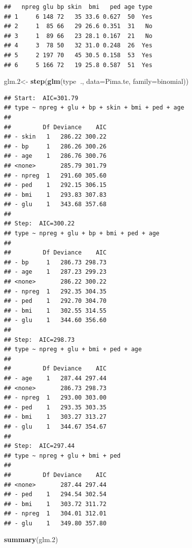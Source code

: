 \documentclass[]{book}
\newenvironment{Shaded}{\begin{snugshade}}{\end{snugshade}}
\newcommand{\KeywordTok}[1]{\textcolor[rgb]{0.13,0.29,0.53}{\textbf{#1}}}
\newcommand{\DataTypeTok}[1]{\textcolor[rgb]{0.13,0.29,0.53}{#1}}
\newcommand{\DecValTok}[1]{\textcolor[rgb]{0.00,0.00,0.81}{#1}}
\newcommand{\StringTok}[1]{\textcolor[rgb]{0.31,0.60,0.02}{#1}}
\newcommand{\OperatorTok}[1]{\textcolor[rgb]{0.81,0.36,0.00}{\textbf{#1}}}
\newcommand{\NormalTok}[1]{#1}
\theoremstyle{definition}
\theoremstyle{definition}
\theoremstyle{definition}
\theoremstyle{remark}
\begin{document}
\begin{verbatim}
##   npreg glu bp skin  bmi   ped age type
## 1     6 148 72   35 33.6 0.627  50  Yes
## 2     1  85 66   29 26.6 0.351  31   No
## 3     1  89 66   23 28.1 0.167  21   No
## 4     3  78 50   32 31.0 0.248  26  Yes
## 5     2 197 70   45 30.5 0.158  53  Yes
## 6     5 166 72   19 25.8 0.587  51  Yes
\end{verbatim}

\begin{Shaded}
\begin{Highlighting}[]
\NormalTok{glm.}\DecValTok{2}\NormalTok{<-}\StringTok{ }\KeywordTok{step}\NormalTok{(}\KeywordTok{glm}\NormalTok{(type}\OperatorTok{~}\NormalTok{., }\DataTypeTok{data=}\NormalTok{Pima.te, }\DataTypeTok{family=}\NormalTok{binomial))}
\end{Highlighting}
\end{Shaded}

\begin{verbatim}
## Start:  AIC=301.79
## type ~ npreg + glu + bp + skin + bmi + ped + age
## 
##         Df Deviance    AIC
## - skin   1   286.22 300.22
## - bp     1   286.26 300.26
## - age    1   286.76 300.76
## <none>       285.79 301.79
## - npreg  1   291.60 305.60
## - ped    1   292.15 306.15
## - bmi    1   293.83 307.83
## - glu    1   343.68 357.68
## 
## Step:  AIC=300.22
## type ~ npreg + glu + bp + bmi + ped + age
## 
##         Df Deviance    AIC
## - bp     1   286.73 298.73
## - age    1   287.23 299.23
## <none>       286.22 300.22
## - npreg  1   292.35 304.35
## - ped    1   292.70 304.70
## - bmi    1   302.55 314.55
## - glu    1   344.60 356.60
## 
## Step:  AIC=298.73
## type ~ npreg + glu + bmi + ped + age
## 
##         Df Deviance    AIC
## - age    1   287.44 297.44
## <none>       286.73 298.73
## - npreg  1   293.00 303.00
## - ped    1   293.35 303.35
## - bmi    1   303.27 313.27
## - glu    1   344.67 354.67
## 
## Step:  AIC=297.44
## type ~ npreg + glu + bmi + ped
## 
##         Df Deviance    AIC
## <none>       287.44 297.44
## - ped    1   294.54 302.54
## - bmi    1   303.72 311.72
## - npreg  1   304.01 312.01
## - glu    1   349.80 357.80
\end{verbatim}

\begin{Shaded}
\begin{Highlighting}[]
\KeywordTok{summary}\NormalTok{(glm.}\DecValTok{2}\NormalTok{)}
\end{Highlighting}
\end{Shaded}
\end{document}
